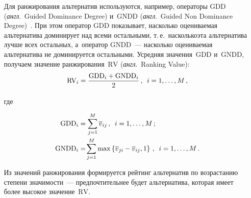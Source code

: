 \begin{multicols}{2}
  Для ранжирования альтернатив используются, например, операторы $\mathrm{GDD}$ 
(\textit{англ}.\ Guided Dominance Degree) и~$\mathrm{GNDD}$ (\textit{англ}.\ 
Guided 
Non Dominance Degree)~\cite{10-gai, 14-gai}. При этом оператор $\mathrm{GDD}$ 
показывает, насколько оце\-ни\-ва\-емая альтернатива доминирует над всеми 
остальными, т.\,е.\ насколько\linebreak эта альтернатива лучше всех остальных, 
а~оператор $\mathrm{GNDD}$~--- насколько %
 оце\-ни\-ва\-емая аль\-тер\-натива не доминируется
остальными. Усредняя значения~$\mathrm{GDD}$ и~$\mathrm{GNDD}$, получаем значение 
ранжирования~$\mathrm{RV}$ (\textit{англ}.\ Ranking Value):
\begin{equation}
\mathrm{RV}_i = \displaystyle\frac{\displaystyle  \mathrm{GDD}_i+\mathrm{GNDD}_i\mathstrut}{\displaystyle 2\mathstrut}\,,\enskip i=1,\ldots , M\,,
  \label{e15-gai}
  \end{equation}
  
  \vspace*{-2pt}
  
  \noindent
  где
  
  \vspace*{-6pt}
  
\noindent
  \begin{align*}
  \mathrm{GDD}_i&= \sum\limits^M_{j=1} \overline{v}_{ij}\,,\enskip i=1,\ldots ,M\,;
  \\
  \mathrm{GNDD}_i&=\! \sum\limits^M_{j=1} \max\left\{ \overline{v}_{ji}-
\overline{v}_{ij},1\right\}\,,\enskip  i=1,\ldots , M\,.
    \end{align*}
    
    \vspace*{1pt}
  
  Из значений ранжирования формируется рейтинг альтернатив по 
возрастанию степени значимости~--- предпочтительнее будет альтернатива, 
которая имеет более высокое значение~$\mathrm{RV}$.

 \begin{figure*}[b] %
      \vspace*{1pt}
    \begin{center}  
  \mbox{%
 \epsfxsize=104.051mm 
 }
\end{center}
\vspace*{-9pt}
\end{figure*}
  

\end{multicols}
